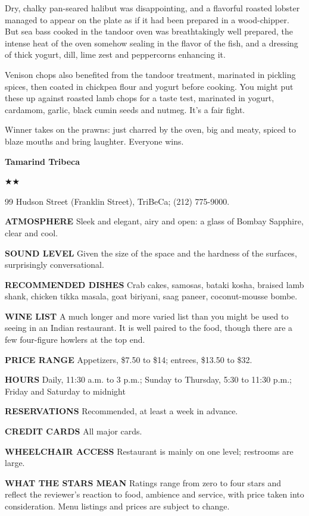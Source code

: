 Dry, chalky pan-seared halibut was disappointing, and a flavorful
roasted lobster managed to appear on the plate as if it had been
prepared in a wood-chipper. But sea bass cooked in the tandoor oven was
breathtakingly well prepared, the intense heat of the oven somehow
sealing in the flavor of the fish, and a dressing of thick yogurt, dill,
lime zest and peppercorns enhancing it.

Venison chops also benefited from the tandoor treatment, marinated in
pickling spices, then coated in chickpea flour and yogurt before
cooking. You might put these up against roasted lamb chops for a taste
test, marinated in yogurt, cardamom, garlic, black cumin seeds and
nutmeg. It's a fair fight.

Winner takes on the prawns: just charred by the oven, big and meaty,
spiced to blaze mouths and bring laughter. Everyone wins.

\textbf{Tamarind Tribeca}

★★

99 Hudson Street (Franklin Street), TriBeCa; (212) 775-9000.

\textbf{ATMOSPHERE} Sleek and elegant, airy and open: a glass of Bombay
Sapphire, clear and cool.

\textbf{SOUND LEVEL} Given the size of the space and the hardness of the
surfaces, surprisingly conversational.

\textbf{RECOMMENDED DISHES} Crab cakes, samosas, bataki kosha, braised
lamb shank, chicken tikka masala, goat biriyani, saag paneer,
coconut-mousse bombe.

\textbf{WINE LIST} A much longer and more varied list than you might be
used to seeing in an Indian restaurant. It is well paired to the food,
though there are a few four-figure howlers at the top end.

\textbf{PRICE RANGE} Appetizers, \$7.50 to \$14; entrees, \$13.50 to
\$32.

\textbf{HOURS} Daily, 11:30 a.m. to 3 p.m.; Sunday to Thursday, 5:30 to
11:30 p.m.; Friday and Saturday to midnight

\textbf{RESERVATIONS} Recommended, at least a week in advance.

\textbf{CREDIT CARDS} All major cards.

\textbf{WHEELCHAIR ACCESS} Restaurant is mainly on one level; restrooms
are large.

\textbf{WHAT THE STARS MEAN} Ratings range from zero to four stars and
reflect the reviewer's reaction to food, ambience and service, with
price taken into consideration. Menu listings and prices are subject to
change.

